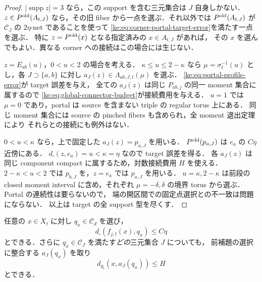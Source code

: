 \begin{proof}
$|\operatorname{supp}z|=3$ なら，この support を含む三元集合は $J$ 自身しかない．
$z\in P^{\rm old}(A_{t,J})$ なら，その旧 fiber から一点を選ぶ．それ以外では
$P^{\rm old}(A_{t,J})$ が $\mathcal C_J$ の $2\eta$-net であることを使って
\eqref{ke:eq:corner-portal-target-error}を満たす一点を選ぶ．
特に $z=P^{\rm old}(x)$ となる指定済みの $x\in A_{t,J}$ があれば，
その $x$ を選んでもよい．異なる corner への接続はこの場合には生じない．

$z=E_{ab}(u)$，$0<u<2$ の場合を考える．
$\kappa\le u\le2-\kappa$ なら
$\mu=\sigma_t^{-1}(u)$ とし，各 $J\supset\{a,b\}$ に対し
$a_J(z)\in\Lambda_{ab,J,t}(\mu)$ を選ぶ．
\eqref{ke:eq:portal-profile-error}が target 誤差を与え，
全ての $a_J(z)$ は同じ $P_{ab,j}$ の同一 moment 集合に属するので
\eqref{ke:eq:global-connector-budget}が接続費用を与える．
$u=1$ では $\mu=0$ であり，portal は source を含まない triple の regular torus 上にある．
同じ moment 集合には source の pinched fibers も含められ，全 moment 退出定理により
それらとの接続にも例外はない．

$0<u<\kappa$ なら，上で固定した $a_J(z)=p_{a,J}$ を用いる．
$P^{\rm old}(p_{a,J})$ は $e_a$ の $C\eta$ 近傍にある．
$d_\square(z,e_a)=u<\kappa=\eta$ なので target 誤差を得る．
各 $a_J(z)$ は同じ component compact に属するため，対数接続費用 $H$ を使える．
$2-\kappa<u<2$ では $p_{b,J}$ を，$z=e_a$ では $p_{a,J}$ を用いる．
$u=\kappa,2-\kappa$ は前段の closed moment interval に含め，それぞれ
$\mu=-\delta,\delta$ の境界 torus から選ぶ．Portal の連続性は要らないので，
端の開区間での固定点選択との不一致は問題にならない．
以上は target の全 support 型を尽くす．
\end{proof}

\begin{lemma}
\label{ke:point-to-corner-portal}
任意の $x\in X_t$ に対し $q_x\in\mathcal C_d$ を選び，
\begin{equation}\label{ke:eq:point-anchor-target-error}
 d_\square(f_{j,t}(x),q_x)\le C\eta
\end{equation}
とできる．さらに $q_x\in\mathcal C_J$ を満たす\emph{どの}三元集合 $J$ についても，
前補題の選択に整合する $a_J(q_x)$ を取り
\begin{equation}\label{ke:eq:point-to-portal-cost}
 d_{g_t}(x,a_J(q_x))\le H
\end{equation}
とできる．
\end{lemma}

